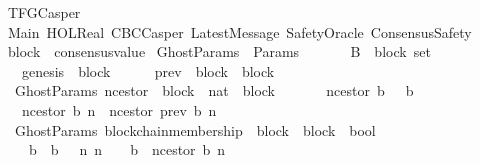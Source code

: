 %
\begin{isabellebody}%
%
%
\isadelimtheory
%
\endisadelimtheory
%
\isatagtheory
{}\isamarkupfalse%
\ TFGCasper\isanewline
\isanewline
{}\ Main\ HOL{\isachardot}Real\ CBCCasper\ LatestMessage\ SafetyOracle\ ConsensusSafety\isanewline
\isanewline
{}%
\endisatagtheory
{\isafoldtheory}%
%
\isadelimtheory
\isanewline
%
\endisadelimtheory
\isanewline
\isanewline
\isanewline
{}\isamarkupfalse%
\ block\ {\isacharequal}\ consensus{\isacharunderscore}value\isanewline
\isanewline
{}\isamarkupfalse%
\ GhostParams\ {\isacharequal}\ Params\ {\isacharplus}\isanewline
\ \ \isanewline
\ \ \ B\ {\isacharcolon}{\isacharcolon}\ {\isachardoublequoteopen}block\ set{\isachardoublequoteclose}\isanewline
\ \ \ genesis\ {\isacharcolon}{\isacharcolon}\ block\isanewline
\ \ \isanewline
\ \ \ prev\ {\isacharcolon}{\isacharcolon}\ {\isachardoublequoteopen}block\ {\isasymRightarrow}\ block{\isachardoublequoteclose}\isanewline
\isanewline
\isanewline
{}\isamarkupfalse%
\ {\isacharparenleft}\ GhostParams{\isacharparenright}\ n{\isacharunderscore}cestor\ {\isacharcolon}{\isacharcolon}\ {\isachardoublequoteopen}block\ {\isacharasterisk}\ nat\ {\isasymRightarrow}\ block{\isachardoublequoteclose}\isanewline
\ \ \isanewline
\ \ \ \ {\isachardoublequoteopen}n{\isacharunderscore}cestor\ {\isacharparenleft}b{\isacharcomma}\ {}{\isacharparenright}\ {\isacharequal}\ b{\isachardoublequoteclose}\isanewline
\ \ {\isacharbar}\ {\isachardoublequoteopen}n{\isacharunderscore}cestor\ {\isacharparenleft}b{\isacharcomma}\ n{\isacharparenright}\ {\isacharequal}\ n{\isacharunderscore}cestor\ {\isacharparenleft}prev\ b{\isacharcomma}\ n{\isacharminus}{}{\isacharparenright}{\isachardoublequoteclose}\isanewline
\isanewline
\isanewline
{}\isamarkupfalse%
\ {\isacharparenleft}\ GhostParams{\isacharparenright}\ blockchain{\isacharunderscore}membership\ {\isacharcolon}{\isacharcolon}\ {\isachardoublequoteopen}block\ {\isasymRightarrow}\ block\ {\isasymRightarrow}\ bool{\isachardoublequoteclose}\ {\isacharparenleft}\ {\isachardoublequoteopen}{\isasymdownharpoonright}{\isachardoublequoteclose}\ {}{}{\isacharparenright}\isanewline
\ \ \isanewline
\ \ \ \ {\isachardoublequoteopen}b{}\ {\isasymdownharpoonright}\ b{}\ {\isacharequal}\ {\isacharparenleft}{\isasymexists}\ n{\isachardot}\ n\ {\isasymin}\ {\isasymnat}\ {\isasymand}\ b{}\ {\isacharequal}\ n{\isacharunderscore}cestor\ {\isacharparenleft}b{}{\isacharcomma}\ n{\isacharparenright}{\isacharparenright}{\isachardoublequoteclose}\isanewline

\end{isabellebody}
